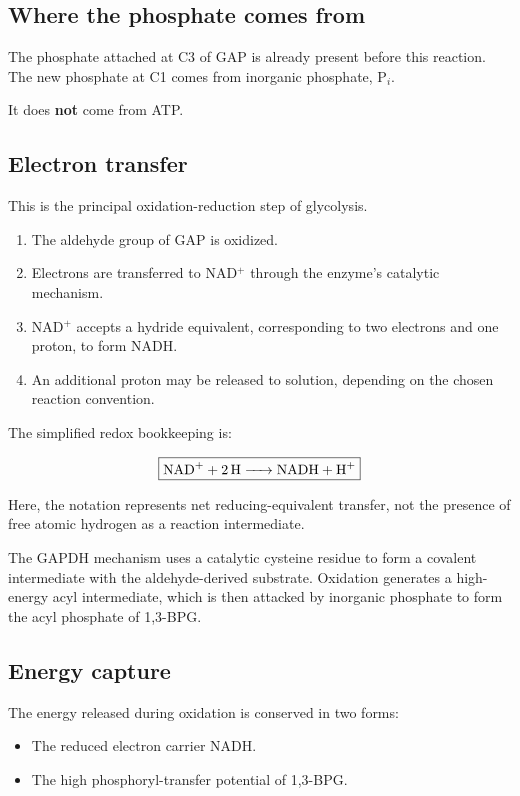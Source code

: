 \documentclass[11pt,a4paper]{article}
\begin{document}
\subsection{Where the phosphate comes from}

The phosphate attached at C3 of GAP is already present before
this reaction. The new phosphate at C1 comes from inorganic
phosphate, P$_i$.

It does \textbf{not} come from ATP.

\subsection{Electron transfer}

This is the principal oxidation-reduction step of glycolysis.

\begin{enumerate}
  \item The aldehyde group of GAP is oxidized.
  \item Electrons are transferred to NAD$^+$ through the enzyme's
  catalytic mechanism.
  \item NAD$^+$ accepts a hydride equivalent, corresponding to
  two electrons and one proton, to form NADH.
  \item An additional proton may be released to solution, depending
  on the chosen reaction convention.
\end{enumerate}

The simplified redox bookkeeping is:

\[
\boxed{
\ce{NAD+ + 2H -> NADH + H+}
}
\]

Here, the notation represents net reducing-equivalent transfer,
not the presence of free atomic hydrogen as a reaction intermediate.

The GAPDH mechanism uses a catalytic cysteine residue to form
a covalent intermediate with the aldehyde-derived substrate.
Oxidation generates a high-energy acyl intermediate, which is
then attacked by inorganic phosphate to form the acyl phosphate
of 1,3-BPG.

\subsection{Energy capture}

The energy released during oxidation is conserved in two forms:

\begin{itemize}
  \item The reduced electron carrier NADH.
  \item The high phosphoryl-transfer potential of 1,3-BPG.
\end{itemize}
\end{document}
